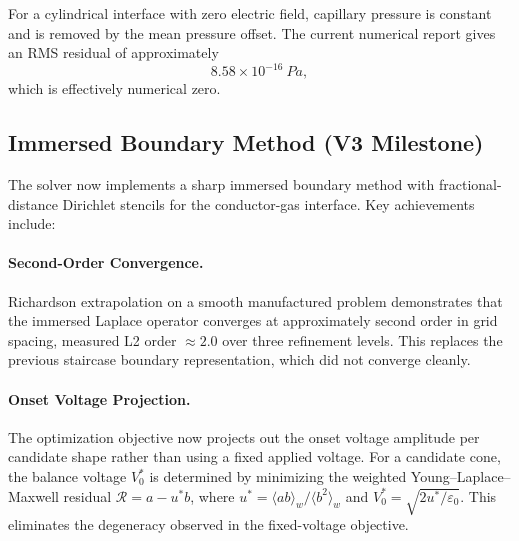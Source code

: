 For a cylindrical interface with zero electric field, capillary pressure is constant and is removed by the mean pressure offset. The current numerical report gives an RMS residual of approximately
\begin{equation*}
8.58\times 10^{-16}\ \si{Pa},
\end{equation*}
which is effectively numerical zero.

\subsection{Immersed Boundary Method (V3 Milestone)}

The solver now implements a sharp immersed boundary method with fractional-distance Dirichlet stencils for the conductor-gas interface. Key achievements include:

\paragraph{Second-Order Convergence.} Richardson extrapolation on a smooth manufactured problem demonstrates that the immersed Laplace operator converges at approximately second order in grid spacing, measured L2 order $\approx 2.0$ over three refinement levels. This replaces the previous staircase boundary representation, which did not converge cleanly.

\paragraph{Onset Voltage Projection.} The optimization objective now projects out the onset voltage amplitude per candidate shape rather than using a fixed applied voltage. For a candidate cone, the balance voltage $V_0^*$ is determined by minimizing the weighted Young--Laplace--Maxwell residual $\mathcal{R} = a - u^* b$, where $u^* = \langle ab \rangle_w / \langle b^2 \rangle_w$ and $V_0^* = \sqrt{2u^*/\varepsilon_0}$. This eliminates the degeneracy observed in the fixed-voltage objective.

